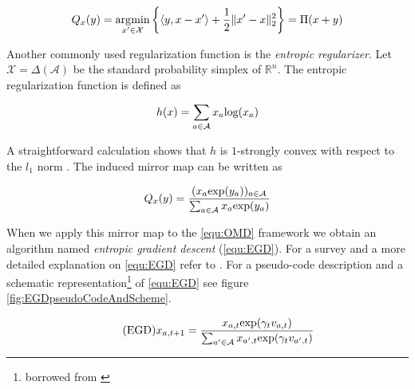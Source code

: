 \begin{equation*}
    Q_x(y) = \operatorname*{\arg\!\min}_{x'\in \mathcal{X}}\bigg\{\langle y,x-x'\rangle + \frac{1}{2}\|x'-x\|_2^2\bigg\} = \Pi(x + y)
\end{equation*}

Another commonly used regularization function is the \textit{entropic regularizer}. Let $\mathcal{X} = \Delta(\mathcal{A})$ be the standard probability simplex of $\mathbb{R}^n$. The entropic regularization function is defined as

\begin{equation*}
    h(x) = \sum_{a\in\mathcal{A}}x_a\textnormal{log}(x_a)
\end{equation*}

A straightforward calculation shows that $h$ is $1$-strongly convex with respect to the $l_1$ norm \cite{HDRmertikopoulos}. The induced mirror map can be written as

\begin{equation*}
    Q_x(y) = \frac{(x_a\textnormal{exp}(y_a))_{a\in\mathcal{A}}}{\sum_{a\in\mathcal{A}}x_a\textnormal{exp}(y_a)}
\end{equation*}

When we apply this mirror map to the \ref{equ:OMD} framework we obtain an algorithm named \textit{entropic gradient descent} (\ref{equ:EGD}). For a survey and a more detailed explanation on \ref{equ:EGD} refer to \cite{shalev}. For a pseudo-code description and a schematic representation\footnote{borrowed from \cite[Chapter 2]{HDRmertikopoulos}} of \ref{equ:EGD} see figure \ref{fig:EGDpseudoCodeAndScheme}.

\begin{equation}
    \tag{EGD}
    x_{a,t+1} = \frac{x_{a,t}\textnormal{exp}(\gamma_t v_{a,t})}{\sum_{a'\in\mathcal{A}}x_{a',t}\textnormal{exp}(\gamma_t v_{a',t})}
    \label{equ:EGD}
\end{equation}


